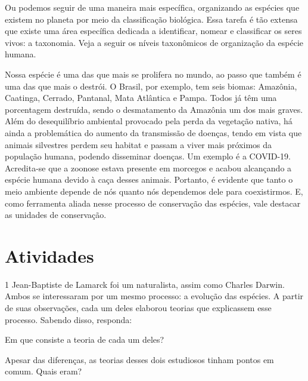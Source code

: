 {Ou podemos seguir de uma maneira mais específica, organizando as
espécies que existem no planeta por meio da classificação biológica.
Essa tarefa é tão extensa que existe uma área específica dedicada a
identificar, nomear e classificar os seres vivos: a taxonomia. Veja a
seguir os níveis taxonômicos de organização da espécie humana.

Nossa espécie é uma das que mais se prolifera no mundo, ao passo que
também é uma das que mais o destrói. O Brasil, por exemplo, tem seis biomas: Amazônia, Caatinga, Cerrado, Pantanal, Mata Atlântica e Pampa. Todos
já têm uma porcentagem destruída, sendo o desmatamento da Amazônia um
dos mais graves. Além do desequilíbrio ambiental provocado pela perda da
vegetação nativa, há ainda a problemática do aumento da transmissão de
doenças, tendo em vista que animais silvestres perdem seu habitat e
passam a viver mais próximos da população humana, podendo disseminar
doenças. Um exemplo é a COVID-19. Acredita-se que a zoonose estava
presente em morcegos e acabou alcançando a espécie humana devido à caça
desses animais. Portanto, é evidente que tanto o meio ambiente depende
de nós quanto nós dependemos dele para coexistirmos. E, como ferramenta
aliada nesse processo de conservação das espécies, vale destacar as
unidades de conservação.}

\section*{Atividades}

\num{1} Jean-Baptiste de Lamarck foi um naturalista, assim como Charles
  Darwin. Ambos se interessaram por um mesmo processo: a evolução das
  espécies. A partir de suas observações, cada um deles elaborou teorias
  que explicassem esse processo. Sabendo disso, responda:

\begin{escolha}
\item Em que consiste a teoria de cada um deles?\\

\item Apesar das diferenças, as teorias desses dois estudiosos tinham pontos em comum. Quais eram?\\
\end{escolha}

